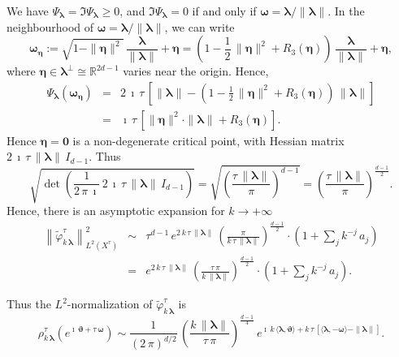 \documentclass[12pt,a4paper]{article}
\theoremstyle{plain}
\theoremstyle{definition}
\begin{document}
We have $\Psi_{\boldsymbol{\lambda}}=\Im\Psi_{\boldsymbol{\lambda}}\ge 0$, and
$\Im\Psi_{\boldsymbol{\lambda}}= 0$
if and only if $\boldsymbol{\omega}=
\boldsymbol{\lambda}/\|\boldsymbol{\lambda}\|$.
In the neighbourhood of $\boldsymbol{\omega}=
\boldsymbol{\lambda}/\|\boldsymbol{\lambda}\|$,
we can write
$$
\boldsymbol{\omega}_{\boldsymbol{\eta}}:=\sqrt{1-\|\boldsymbol{\eta}\|^2}\,
\frac{\boldsymbol{\lambda}}{\|\boldsymbol{\lambda}\|}+
\boldsymbol{\eta}=\left(1-\frac{1}{2}\,\|\boldsymbol{\eta}\|^2
+R_3(\boldsymbol{\eta})\right)\,\frac{\boldsymbol{\lambda}}{\|\boldsymbol{\lambda}\|}+
\boldsymbol{\eta},
$$
where $\boldsymbol{\eta}\in \boldsymbol{\lambda}^\perp
\cong \mathbb{R}^{2d-1}$
varies near the origin.
Hence,
\begin{eqnarray*}
\Psi_{\boldsymbol{\lambda}}(\boldsymbol{\omega}_{\boldsymbol{\eta}})&=&
2\,\imath\,\tau\,
\left[ \|\boldsymbol{\lambda}\|- 
\left(1-\frac{1}{2}\,\|\boldsymbol{\eta}\|^2
+R_3(\boldsymbol{\eta})\right)\,\|\boldsymbol{\lambda}\|
     \right]\\
     &=&\imath\,\tau\,\left[\|\boldsymbol{\eta}\|^2\cdot 
     \|\boldsymbol{\lambda}\|+R_3(\boldsymbol{\eta})\right].
\end{eqnarray*}
Hence $\boldsymbol{\eta}=\mathbf{0}$ is a 
non-degenerate critical point, with Hessian
matrix $2\,\imath\,\tau\,\|\boldsymbol{\lambda}\|\,I_{d-1}$.
Thus
$$
\sqrt{\det\left( \frac{1}{2\,\pi\,\imath}	\,2\,\imath\,
\tau\,\|\boldsymbol{\lambda}\|\,I_{d-1}   \right)}
=\sqrt{\left(\frac{\tau\,\|\boldsymbol{\lambda}\|}{\pi}\right)^{d-1}}=
\left(\frac{\tau\,\|\boldsymbol{\lambda}\|}{\pi}\right)
^{\frac{d-1}{2}}
.
$$
Hence, there is an asymptotic expansion for 
$k\rightarrow +\infty$ 
\begin{eqnarray*}
\left\|\tilde{\varphi}_{k\,\boldsymbol{\lambda}}^\tau\right\|^2
_{L^2(X^\tau)}&\sim& \tau^{d-1}\,e^{2\,k\,\tau\,\|\boldsymbol{\lambda}\|}\,
\left(\frac{\pi}{k\,\tau\,\|\boldsymbol{\lambda}\|}\right)
^{\frac{d-1}{2}}\cdot \left(1+\sum_jk^{-j}\,a_j\right)\\
&=&e^{2\,k\,\tau\,\|\boldsymbol{\lambda}\|}\,
\left(\frac{\tau\,\pi}{k\,\|\boldsymbol{\lambda}\|}\right)
^{\frac{d-1}{2}}\cdot \left(1+\sum_jk^{-j}\,a_j\right)
.
\end{eqnarray*}


Thus the $L^2$-normalization of 
$\tilde{\varphi}^\tau_{k\,\boldsymbol{\lambda}}$
is
$$
\rho^\tau_{k\,\boldsymbol{\lambda}}
\left( e^{\imath\,\boldsymbol{\vartheta}+\tau\,\boldsymbol{\omega}}   \right)
\sim \frac{1}{(2\,\pi)^{d/2}}\,
\left(\frac{k\,\|\boldsymbol{\lambda}\|}{\tau\,\pi}\right)
^{\frac{d-1}{4}}\,
e^{\imath\,k\,
\langle\boldsymbol{\lambda},\boldsymbol{\vartheta}
\rangle
+k\,\tau\,\left[\langle
\boldsymbol{\lambda},-\boldsymbol{\omega}
\rangle-\|\boldsymbol{\lambda}\|\right]
}.
$$
\end{document}
